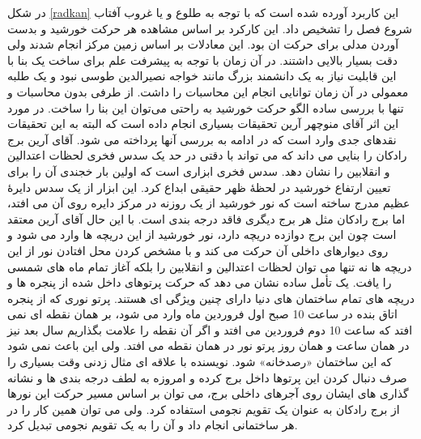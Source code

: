 \documentclass{article}
\begin{document}
	در شکل \ref{radkan}  این کاربرد آورده شده است که با توجه به طلوع و یا غروب آفتاب شروع فصل را تشخیص داد. این کارکرد بر اساس مشاهده هر حرکت خورشید و بدست آوردن مدلی برای حرکت ان بود. این معادلات بر اساس زمین مرکز انجام شدند ولی دقت بسیار بالایی داشتند. در آن زمان با توجه به پیشرفت علم برای ساخت یک بنا با این قابلیت نیاز به یک دانشمند بزرگ مانند خواجه نصیرالدین طوسی نبود و یک طلبه معمولی در آن زمان توانایی انجام این محاسبات را داشت. از طرفی بدون محاسبات و تنها با بررسی ساده الگو حرکت خورشید به راحتی می‌توان این بنا را ساخت.
	در مورد این اثر آقای منوچهر آرین تحقیقات بسیاری انجام داده است که البته به این تحقیقات نقدهای جدی وارد است که در ادامه به بررسی آنها پرداخته می شود.
	\clearpage
آقای آرین 	برج رادکان را بنایی می داند که می تواند با دقتی در حد یک سدس فخری لحظات اعتدالین و انقلابین را نشان دهد. سدس فخری ابزاری است که اولین بار خجندی آن را برای تعیین ارتفاع خورشید در لحظۀ ظهر حقیقی ابداع کرد. این ابزار از یک سدس دایرۀ عظیم مدرج ساخته است که نور خورشید از یک روزنه در مرکز دایره روی آن می افتد، اما برج رادکان مثل هر برج دیگری فاقد درجه بندی است. با این حال آقای آرین  معتقد است چون این برج دوازده دریچه دارد، نور خورشید از این دریچه ها وارد می شود و روی دیوارهای داخلی آن حرکت می کند و با مشخص کردن محل افتادن نور از این دریچه ها نه تنها می توان لحظات اعتدالین و انقلابین را 
بلکه آغاز تمام ماه های شمسی را یافت.
یک تأمل ساده نشان می دهد که حرکت پرتوهای داخل شده از پنجره ها و دریچه های تمام ساختمان های دنیا دارای چنین ویژگی ای هستند. پرتو نوری که از پنجره اتاق بنده در ساعت 10 صبح اول فروردین ماه وارد می شود، بر همان نقطه ای نمی افتد که ساعت 10 دوم فروردین می افتد و اگر آن نقطه را علامت بگذاریم سال بعد نیز در همان ساعت و همان روز پرتو نور در همان نقطه می افتد. ولی این باعث نمی شود که این ساختمان «رصدخانه» شود. نویسنده با علاقه ای مثال زدنی وقت بسیاری را صرف دنبال کردن این پرتوها داخل برج کرده و امروزه به لطف درجه بندی ها و نشانه گذاری های ایشان روی آجرهای داخلی برج، می توان بر اساس مسیر حرکت 
این نورها از برج رادکان به عنوان یک تقویم نجومی استفاده کرد. ولی می توان همین کار را در هر ساختمانی انجام داد و آن را به یک تقویم نجومی تبدیل کرد.
\end{document}
